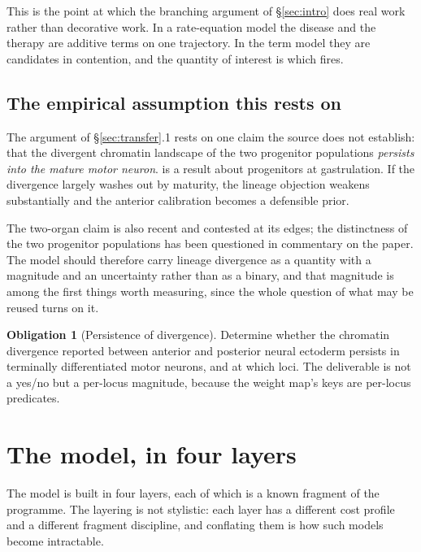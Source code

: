 \documentclass[11pt,a4paper]{article}
\theoremstyle{plain}
\theoremstyle{definition}
\newtheorem{obligation}[theorem]{Obligation}
\theoremstyle{remark}
\begin{document}
This is the point at which the branching argument of \S\ref{sec:intro} does
real work rather than decorative work. In a rate-equation model the disease
and the therapy are additive terms on one trajectory. In the term model they
are candidates in contention, and the quantity of interest is which fires.

\subsection{The empirical assumption this rests on}

The argument of \S\ref{sec:transfer}.1 rests on one claim the source does not
establish: that the divergent chromatin landscape of the two progenitor
populations \emph{persists into the mature motor neuron}. \cite{TwoOrgans} is
a result about progenitors at gastrulation. If the divergence largely washes
out by maturity, the lineage objection weakens substantially and the anterior
calibration becomes a defensible prior.

The two-organ claim is also recent and contested at its edges; the
distinctness of the two progenitor populations has been questioned in
commentary on the paper. The model should therefore carry lineage divergence as
a quantity with a magnitude and an uncertainty rather than as a binary, and
that magnitude is among the first things worth measuring, since the whole
question of what may be reused turns on it.

\begin{obligation}[Persistence of divergence]\label{ob:persist}
Determine whether the chromatin divergence reported between anterior and
posterior neural ectoderm persists in terminally differentiated motor neurons,
and at which loci. The deliverable is not a yes/no but a per-locus magnitude,
because the weight map's keys are per-locus predicates.
\end{obligation}

\section{The model, in four layers}\label{sec:layers}

The model is built in four layers, each of which is a known fragment of the
programme. The layering is not stylistic: each layer has a different cost
profile and a different fragment discipline, and conflating them is how such
models become intractable.
\end{document}
